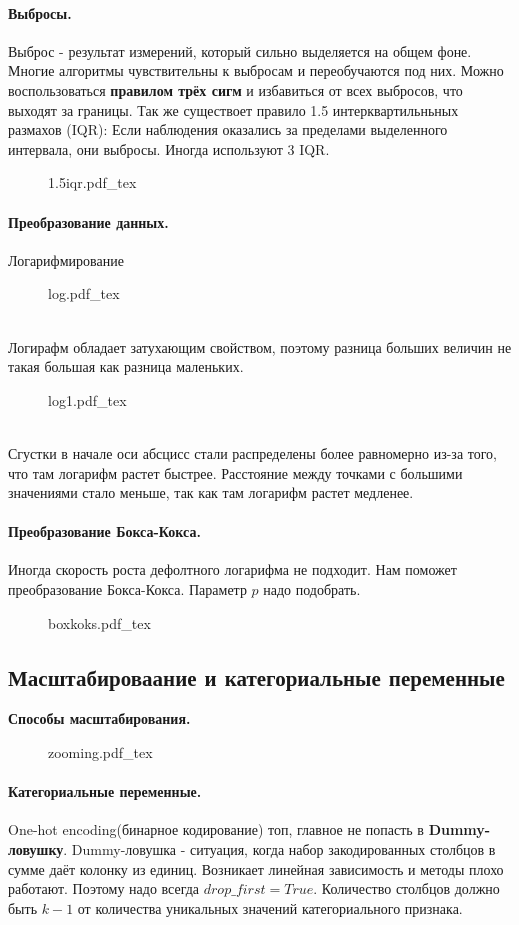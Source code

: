\documentclass{article}
\newcommand{\incfig}[2][1]{%
    \def\svgwidth{#1\columnwidth}
    {#2.pdf_tex}
}
\begin{document}
\paragraph{Выбросы.}
Выброс - результат измерений, который сильно выделяется на общем фоне. Многие алгоритмы чувствительны к выбросам и переобучаются под них. Можно воспользоваться {\bf правилом трёх сигм} и избавиться от всех выбросов, что выходят за границы. Так же существоет правило 1.5 интерквартильньных размахов (IQR): Если наблюдения оказались за пределами выделенного интервала, они выбросы. Иногда используют 3 IQR.
\begin{figure}[h!]
  \centering
  \incfig{1.5iqr}
\end{figure}
\paragraph{Преобразование данных.}
Логарифмирование
\begin{figure}[h!]
  \centering
  \incfig{log}
\end{figure}
\\
Логирафм обладает затухающим свойством, поэтому разница больших величин не такая большая как разница маленьких.
\begin{figure}[h!]
  \centering
  \incfig{log1}
\end{figure}
\\
Сгустки в начале оси абсцисс стали распределены более равномерно из-за того, что там логарифм растет быстрее. Расстояние между точками с большими значениями стало меньше, так как там логарифм растет медленее.
\paragraph{Преобразование Бокса-Кокса.}
Иногда скорость роста дефолтного логарифма не подходит. Нам поможет преобразование Бокса-Кокса. Параметр $p$ надо подобрать.
\begin{figure}[h!]
  \centering
  \incfig{boxkoks}
\end{figure}
\newpage
\subsection{Масштабироваание и категориальные переменные}
{\bf Способы масштабирования.}
\begin{figure}[h!]
  \centering
  \incfig{zooming}
\end{figure}
\paragraph{Категориальные переменные.}
One-hot encoding(бинарное кодирование) топ, главное не попасть в {\bf Dummy-ловушку}. Dummy-ловушка - ситуация, когда набор закодированных столбцов в сумме даёт колонку из единиц. Возникает линейная зависимость и методы плохо работают. Поэтому надо всегда $drop\_first=True$. Количество столбцов должно быть $k-1$ от количества уникальных значений категориального признака.
\end{document}
